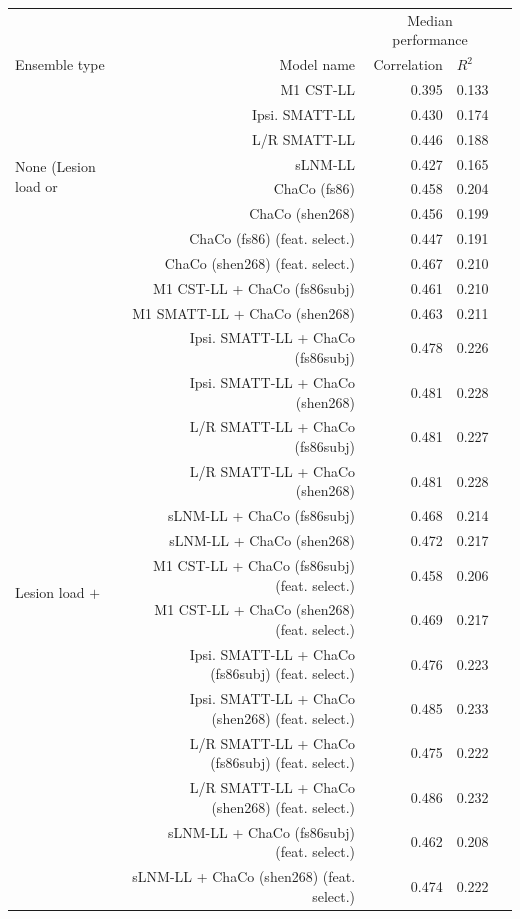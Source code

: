 \documentclass[phd,tocprelim]{cornell}
\def\Plus{\texttt{+}}
\begin{document}
\begin{table}[h]
\centering
\label{table:5}
\begin{tabular}{lrrll}
\toprule
 &  & \multicolumn{2}{c}{Median performance} \\
Ensemble type & Model name & Correlation & $R^2$  \\
\midrule
\multirow[t]{8}{*}{None (Lesion load or} & M1 CST-LL & 0.395 & 0.133 \\
 ChaCo only)& Ipsi. SMATT-LL & 0.430 & 0.174 \\
 & L/R SMATT-LL & 0.446 & 0.188 \\
 & sLNM-LL & 0.427 & 0.165 \\
 & ChaCo (fs86) & 0.458 & 0.204 \\
 & ChaCo (shen268) & 0.456 & 0.199 \\
 & ChaCo (fs86) (feat. select.) & 0.447 & 0.191 \\
 & ChaCo (shen268) (feat. select.) & 0.467 & 0.210 \\
\multirow[t]{16}{*}{Lesion load $\Plus$} & M1 CST-LL + ChaCo (fs86subj) & 0.461 & 0.210 \\
 ChaCo & M1 SMATT-LL + ChaCo (shen268) & 0.463 & 0.211 \\
 & Ipsi. SMATT-LL + ChaCo (fs86subj) & 0.478 & 0.226 \\
 & Ipsi. SMATT-LL + ChaCo (shen268) & 0.481 & 0.228 \\
 & L/R SMATT-LL + ChaCo (fs86subj) & 0.481 & 0.227 \\
 & L/R SMATT-LL + ChaCo (shen268) & 0.481 & 0.228 \\
 & sLNM-LL + ChaCo (fs86subj) & 0.468 & 0.214 \\
 & sLNM-LL + ChaCo (shen268) & 0.472 & 0.217 \\
 & M1 CST-LL + ChaCo (fs86subj) (feat. select.) & 0.458 & 0.206 \\
 & M1 CST-LL + ChaCo (shen268) (feat. select.) & 0.469 & 0.217 \\
 & Ipsi. SMATT-LL + ChaCo (fs86subj) (feat. select.) & 0.476 & 0.223 \\
 & Ipsi. SMATT-LL + ChaCo (shen268) (feat. select.) & 0.485 & 0.233 \\
 & L/R SMATT-LL + ChaCo (fs86subj) (feat. select.) & 0.475 & 0.222 \\
 & L/R SMATT-LL + ChaCo (shen268) (feat. select.) & 0.486 & 0.232 \\
 & sLNM-LL + ChaCo (fs86subj) (feat. select.) & 0.462 & 0.208 \\
 & sLNM-LL + ChaCo (shen268) (feat. select.) & 0.474 & 0.222 \\

\end{tabular}
\end{table}
\end{document}
